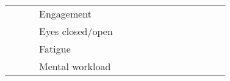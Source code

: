 \begin{tabular}{p{1.5cm}p{1.5cm}p{1.5cm}p{1.5cm}p{0.6cm}p{0.6cm}p{0.6cm}p{0.6cm}p{0.6cm}p{0.6cm}p{0.6cm}p{0.6cm}p{0.6cm}p{0.6cm}p{0.6cm}}
                                &                 &                   & Engagement &                                                             &                                                                                                                             &                                                                        &                                      &                                                            &                      &                         &                               &                     &           \cite{Li2017} &                                                                      \\
                                &                 &                   & Eyes closed/open &                                                             &                                                                                                                             &                                                                        &                    \cite{Narejo2016} &                                                            &                      &                         &                               &                     &                         &                                                                      \\
                                &                 &                   & Fatigue &                                                             &                                                                                                      \cite{Hajinoroozi2016} &                                                                        &                                      &                                                            &                      &                         &                               &                     &                         &                                                                      \\
                                &                 &                   & Mental workload &                                   \cite{Yin2017a, Yin2016b} &                                                                                              \cite{Almogbel2018, Zhang2017} &                                          \cite{Hefron2018, Kuanar2018} &                                      &                                                            &                      &                         &                               &                     &                         &                                                    \cite{Hefron2017} \\

\end{tabular}
